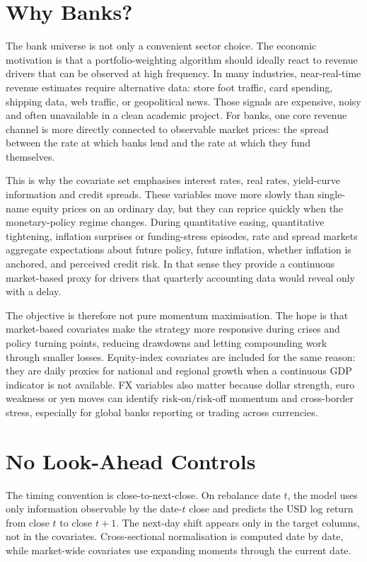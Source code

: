 ﻿\documentclass[10pt,a4paper]{article}
\begin{document}
\section{Why Banks?}

The bank universe is not only a convenient sector choice. The economic motivation is that a portfolio-weighting algorithm should ideally react to revenue drivers that can be observed at high frequency. In many industries, near-real-time revenue estimates require alternative data: store foot traffic, card spending, shipping data, web traffic, or geopolitical news. Those signals are expensive, noisy and often unavailable in a clean academic project. For banks, one core revenue channel is more directly connected to observable market prices: the spread between the rate at which banks lend and the rate at which they fund themselves.

This is why the covariate set emphasises interest rates, real rates, yield-curve information and credit spreads. These variables move more slowly than single-name equity prices on an ordinary day, but they can reprice quickly when the monetary-policy regime changes. During quantitative easing, quantitative tightening, inflation surprises or funding-stress episodes, rate and spread markets aggregate expectations about future policy, future inflation, whether inflation is anchored, and perceived credit risk. In that sense they provide a continuous market-based proxy for drivers that quarterly accounting data would reveal only with a delay.

The objective is therefore not pure momentum maximisation. The hope is that market-based covariates make the strategy more responsive during crises and policy turning points, reducing drawdowns and letting compounding work through smaller losses. Equity-index covariates are included for the same reason: they are daily proxies for national and regional growth when a continuous GDP indicator is not available. FX variables also matter because dollar strength, euro weakness or yen moves can identify risk-on/risk-off momentum and cross-border stress, especially for global banks reporting or trading across currencies.

\section{No Look-Ahead Controls}

The timing convention is close-to-next-close. On rebalance date \(t\), the model uses only information observable by the date-\(t\) close and predicts the USD log return from close \(t\) to close \(t+1\). The next-day shift appears only in the target columns, not in the covariates. Cross-sectional normalisation is computed date by date, while market-wide covariates use expanding moments through the current date.
\end{document}
